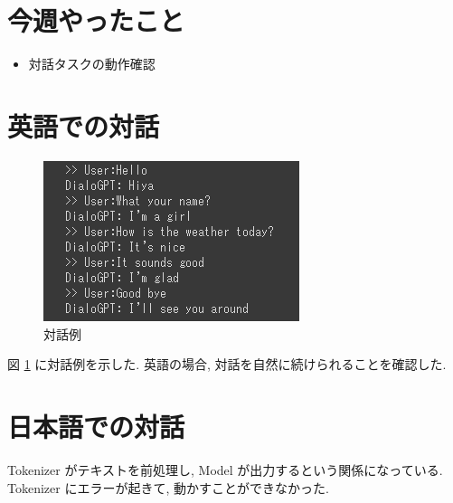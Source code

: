 \documentclass[twocolumn]{jarticle}     %
\begin{document}



\section{今週やったこと}
\begin{itemize}
  \item 対話タスクの動作確認
\end{itemize}

\section{英語での対話}

\begin{figure}[tb]
  \begin{center}
    \includegraphics[clip,width=75mm]{ss.png}
    \caption{対話例}
    \label{fig:con}
  \end{center}
\end{figure}

図 \ref{fig:con} に対話例を示した.
英語の場合, 対話を自然に続けられることを確認した.



\section{日本語での対話}

Tokenizer がテキストを前処理し, Model が出力するという関係になっている.
Tokenizer にエラーが起きて, 動かすことができなかった.
\end{document}
